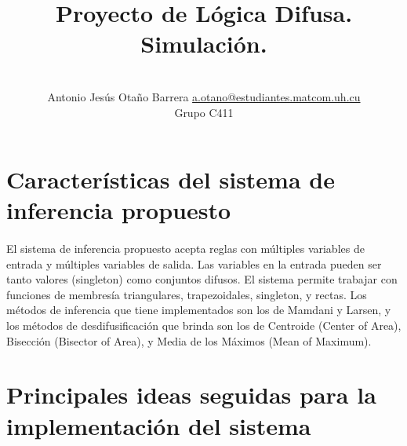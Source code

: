 \documentclass[a4paper,10pt]{article}
\title{Proyecto de Lógica Difusa. Simulación.}
\author{\\
\name Antonio Jesús Otaño Barrera \email \href{mailto:a.otano@estudiantes.matcom.uh.cu}{a.otano@estudiantes.matcom.uh.cu}
	\\ \addr Grupo C411}
\begin{document}
\maketitle





\section{Características del sistema de inferencia propuesto}\label{sec:0}

  \paragraph{} El sistema de inferencia propuesto acepta reglas con  múltiples variables de entrada y múltiples variables de salida. Las variables
  en la entrada pueden ser tanto valores (singleton) como conjuntos difusos. El sistema permite trabajar con funciones de membresía triangulares,
  trapezoidales, singleton, y rectas. Los métodos de inferencia que tiene implementados son los de Mamdani y Larsen, y los métodos de desdifusificación que
  brinda son los de Centroide (Center of Area), Bisección (Bisector of Area), y Media de los Máximos (Mean of Maximum).


\section{Principales ideas seguidas para la implementación del sistema}\label{sec:1}
\end{document}
